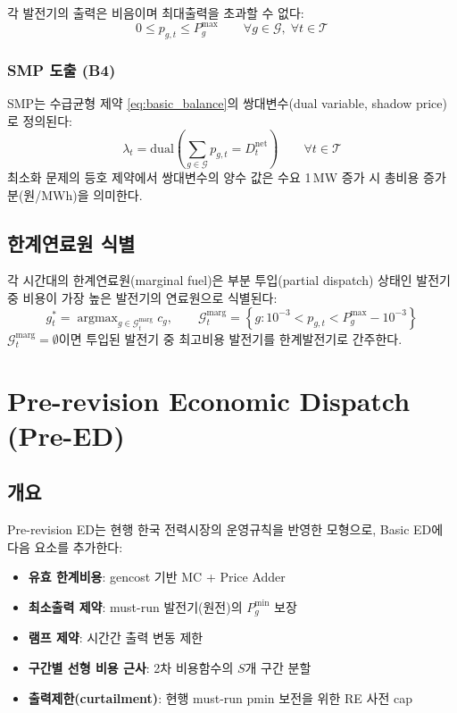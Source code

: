 \documentclass[11pt, a4paper]{article}
\DeclareMathOperator*{\argmax}{argmax}
\begin{document}
각 발전기의 출력은 비음이며 최대출력을 초과할 수 없다:
\begin{equation}\label{eq:basic_bounds}
    0 \leq p_{g,t} \leq P_g^{\max} \qquad \forall g \in \mathcal{G}, \; \forall t \in \mathcal{T}
\end{equation}

\subsubsection{SMP 도출 (B4)}

SMP는 수급균형 제약 \eqref{eq:basic_balance}의 쌍대변수(dual variable, shadow price)로 정의된다:
\begin{equation}\label{eq:basic_smp}
    \boxed{\lambda_t = \text{dual}\!\left(\sum_{g \in \mathcal{G}} p_{g,t} = D_t^{\text{net}}\right) \qquad \forall t \in \mathcal{T}}
\end{equation}
최소화 문제의 등호 제약에서 쌍대변수의 양수 값은
수요 1\,MW 증가 시 총비용 증가분(원/MWh)을 의미한다.

\subsection{한계연료원 식별}

각 시간대의 한계연료원(marginal fuel)은 부분 투입(partial dispatch) 상태인 발전기 중
비용이 가장 높은 발전기의 연료원으로 식별된다:
\begin{equation}
    g_t^* = \argmax_{g \in \mathcal{G}_t^{\text{marg}}} c_g
    , \qquad
    \mathcal{G}_t^{\text{marg}} = \left\{g : 10^{-3} < p_{g,t} < P_g^{\max} - 10^{-3}\right\}
\end{equation}
$\mathcal{G}_t^{\text{marg}} = \emptyset$이면 투입된 발전기 중 최고비용 발전기를 한계발전기로 간주한다.


\section{Pre-revision Economic Dispatch (Pre-ED)}\label{sec:pre_ed}

\subsection{개요}

Pre-revision ED는 현행 한국 전력시장의 운영규칙을 반영한 모형으로,
Basic ED에 다음 요소를 추가한다:
\begin{itemize}[noitemsep]
    \item \textbf{유효 한계비용}: gencost 기반 MC + Price Adder
    \item \textbf{최소출력 제약}: must-run 발전기(원전)의 $P_g^{\min}$ 보장
    \item \textbf{램프 제약}: 시간간 출력 변동 제한
    \item \textbf{구간별 선형 비용 근사}: 2차 비용함수의 $S$개 구간 분할
    \item \textbf{출력제한(curtailment)}: 현행 must-run pmin 보전을 위한 RE 사전 cap
\end{itemize}
\end{document}
